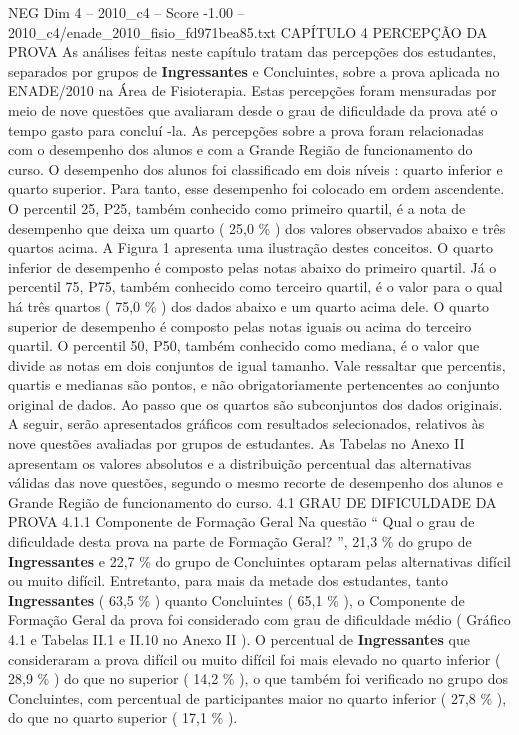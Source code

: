 \begin{textsample}{NEG Dim 4 – 2010\_c4 – Score -1.00 – 2010\_c4/enade\_2010\_fisio\_fd971bea85.txt}  \label{ex:f4_neg_067}
CAPÍTULO 4 PERCEPÇÃO DA PROVA As análises feitas neste capítulo tratam das percepções dos estudantes, separados por grupos de \textbf{Ingressantes} e Concluintes, sobre a prova aplicada no ENADE/2010 na Área de Fisioterapia.
Estas percepções foram mensuradas por meio de nove questões que avaliaram desde o grau de dificuldade da prova até o tempo gasto para concluí -la.
As percepções sobre a prova foram relacionadas com o desempenho dos alunos e com a Grande Região de funcionamento do curso.
O desempenho dos alunos foi classificado em dois níveis : quarto inferior e quarto superior.
Para tanto, esse desempenho foi colocado em ordem ascendente.
O percentil 25, P25, também conhecido como primeiro quartil, é a nota de desempenho que deixa um quarto ( 25,0 \% ) dos valores observados abaixo e três quartos acima.
A Figura 1 apresenta uma ilustração destes conceitos.
O quarto inferior de desempenho é composto pelas notas abaixo do primeiro quartil.
Já o percentil 75, P75, também conhecido como terceiro quartil, é o valor para o qual há três quartos ( 75,0 \% ) dos dados abaixo e um quarto acima dele.
O quarto superior de desempenho é composto pelas notas iguais ou acima do terceiro quartil.
O percentil 50, P50, também conhecido como mediana, é o valor que divide as notas em dois conjuntos de igual tamanho.
Vale ressaltar que percentis, quartis e medianas são pontos, e não obrigatoriamente pertencentes ao conjunto original de dados.
Ao passo que os quartos são subconjuntos dos dados originais.
A seguir, serão apresentados gráficos com resultados selecionados, relativos às nove questões avaliadas por grupos de estudantes.
As Tabelas no Anexo II apresentam os valores absolutos e a distribuição percentual das alternativas válidas das nove questões, segundo o mesmo recorte de desempenho dos alunos e Grande Região de funcionamento do curso. 4.1 GRAU DE DIFICULDADE DA PROVA 4.1.1 Componente de Formação Geral Na questão “ Qual o grau de dificuldade desta prova na parte de Formação Geral? ”, 21,3 \% do grupo de \textbf{Ingressantes} e 22,7 \% do grupo de Concluintes optaram pelas alternativas difícil ou muito difícil.
Entretanto, para mais da metade dos estudantes, tanto \textbf{Ingressantes} ( 63,5 \% ) quanto Concluintes ( 65,1 \% ), o Componente de Formação Geral da prova foi considerado com grau de dificuldade médio ( Gráfico 4.1 e Tabelas II.1 e II.10 no Anexo II ).
O percentual de \textbf{Ingressantes} que consideraram a prova difícil ou muito difícil foi mais elevado no quarto inferior ( 28,9 \% ) do que no superior ( 14,2 \% ), o que também foi verificado no grupo dos Concluintes, com percentual de participantes maior no quarto inferior ( 27,8 \% ), do que no quarto superior ( 17,1 \% ).

\end{textsample}
